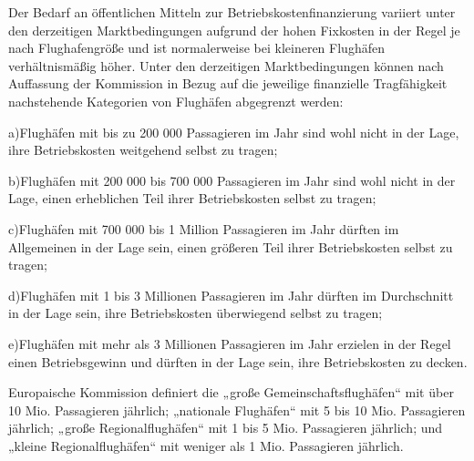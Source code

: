  	
Der Bedarf an öffentlichen Mitteln zur Betriebskostenfinanzierung variiert unter den derzeitigen Marktbedingungen
 aufgrund der hohen Fixkosten in der Regel je nach Flughafengröße und ist normalerweise bei kleineren Flughäfen
  verhältnismäßig höher. Unter den derzeitigen Marktbedingungen können nach Auffassung der Kommission in Bezug auf
   die jeweilige finanzielle Tragfähigkeit nachstehende Kategorien von Flughäfen abgegrenzt werden:

a)Flughäfen mit bis zu 200 000 Passagieren im Jahr sind wohl nicht in der Lage, ihre Betriebskosten weitgehend selbst zu tragen;

b)Flughäfen mit 200 000 bis 700 000 Passagieren im Jahr sind wohl nicht in der Lage, einen erheblichen 
Teil ihrer Betriebskosten selbst zu tragen;

c)Flughäfen mit 700 000 bis 1 Million Passagieren im Jahr dürften im Allgemeinen in der Lage sein, einen 
größeren Teil ihrer Betriebskosten selbst zu tragen;

d)Flughäfen mit 1 bis 3 Millionen Passagieren im Jahr dürften im Durchschnitt in der Lage sein, ihre Betriebskosten überwiegend selbst zu tragen;

e)Flughäfen mit mehr als 3 Millionen Passagieren im Jahr erzielen in der Regel einen Betriebsgewinn und dürften 
in der Lage sein, ihre Betriebskosten zu decken.

Europaische Kommission definiert die „große Gemeinschaftsflughäfen“ mit über 10 Mio. Passagieren jährlich; 
„nationale Flughäfen“ mit 5 bis 10 Mio. Passagieren jährlich;
„große Regionalflughäfen“ mit 1 bis 5 Mio. Passagieren jährlich; und „kleine Regionalflughäfen“ mit weniger als 1 Mio. Passagieren jährlich.